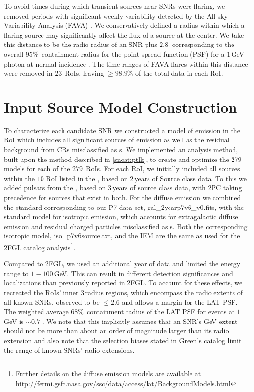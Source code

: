 {To avoid times during which transient sources near SNRs were flaring, we removed periods with significant weekly variability detected by the \Fermi{} All-sky Variability Analysis (FAVA) \citep{fava13}. We conservatively defined a radius within which a flaring source may significantly affect the flux of a source at the center. We take this distance to be the radio radius of an SNR plus $2.8$\degr, corresponding to the overall $95\%$~containment radius for the \FermiLat{} point spread function (PSF) for a $1$\,GeV photon at normal incidence \citep{lat_perf}. The time ranges of FAVA flares within this distance were removed in $23$~RoIs, leaving $\geq 98.9\%$ of the total data in each RoI.

\section{Input Source Model Construction}\label{snrcat:AddSrcs}
To characterize each candidate SNR we constructed a model of \gam{} emission in the RoI which includes all significant sources of emission as well as the residual background from CRs misclassified as \gam{}s. We implemented an analysis method, built upon the \srcs{} method described in \ref{sncat:ptlk}, to create and optimize the 279 models for each of the $279$~RoIs. For each RoI, we initially included all sources within the $10$\degr{} RoI listed in the \twofgl{} \citep{2FGL}, based on $2$\,years of Source class data. To this we added pulsars from the \twopc{} \citep{2PC}, based on $3$\,years of source class data, with 2PC taking precedence for sources that exist in both. 
For the diffuse emission we combined the standard \iem{} corresponding to our P7 data set, gal\_2yearp7v6\_v0.fits, with the standard model for isotropic emission, which accounts for extragalactic diffuse \gam{} emission and residual charged particles misclassified as \gam{}s. Both the corresponding isotropic model, iso\_p7v6source.txt, and the IEM are the same as used for the 2FGL catalog analysis\footnote{Further details on the diffuse emission models are available at \url{http://fermi.gsfc.nasa.gov/ssc/data/access/lat/BackgroundModels.html} \jamie{and in Chapter blah]}}. 

Compared to 2FGL, we used an additional year of data and limited the energy range to $1-100$\,GeV. This can result in different detection significances and localizations than previously reported in 2FGL. To account for these effects, we recreated the RoIs' inner $3$\degr{}\,radius regions, which encompass the radio extents of all known SNRs, observed to be $\leq 2.6$\degr{} and allows a margin for the LAT PSF. The weighted average $68\%$~containment radius of the LAT PSF for events at $1$\,GeV is $\sim0.7$\degr{} \citep{lat_perfo}. We note that this implicitly assumes that an SNR's GeV extent should not be more than about an order of magnitude larger than its radio extension and also note that the selection biases stated in Green's catalog limit the range of known SNRs' radio extensions. 

}
